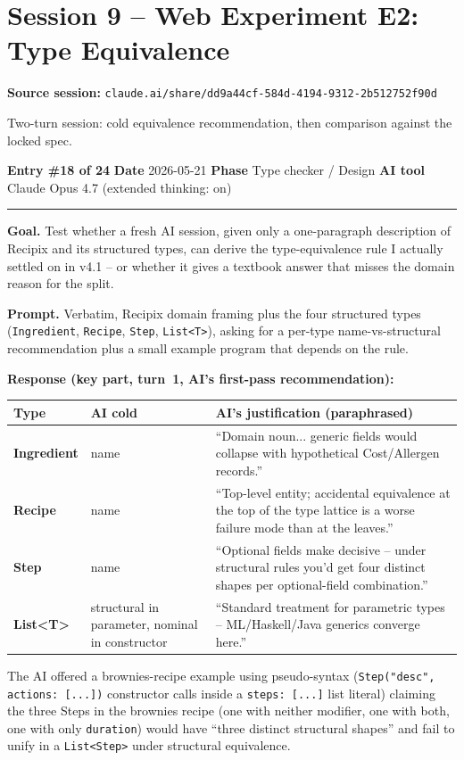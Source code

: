 \documentclass[11pt,a4paper]{article}
\newcommand{\entryheader}[4]{%
    \par\vspace{1em}\noindent\textbf{Entry \#{#1}} \textbullet{} \textbf{Date} #2 \textbullet{} \textbf{Phase} #3 \textbullet{} \textbf{AI tool} #4 \par\vspace{0.3em}\noindent\rule{\textwidth}{0.4pt}\par\vspace{0.3em}}
\newcommand{\sessionheader}[1]{%
    \par\vspace{1.5em}\noindent\textbf{Source session: }\texttt{#1}\par\vspace{0.5em}}
\newcommand{\field}[1]{\noindent\textbf{#1}}
\begin{document}
\section{Session 9 -- Web Experiment E2: Type Equivalence}

\sessionheader{claude.ai/share/dd9a44cf-584d-4194-9312-2b512752f90d}

Two-turn session: cold equivalence recommendation, then comparison
against the locked spec.

\entryheader{18 of 24}{2026-05-21}{Type checker / Design}{Claude Opus 4.7 (extended thinking: on)}

\field{Goal.} Test whether a fresh AI session, given only a
one-paragraph description of Recipix and its structured types, can
derive the type-equivalence rule I actually settled on in v4.1 -- or
whether it gives a textbook answer that misses the domain reason for
the split.

\field{Prompt.} Verbatim, Recipix domain framing plus the four
structured types (\texttt{Ingredient}, \texttt{Recipe}, \texttt{Step},
\texttt{List<T>}), asking for a per-type name-vs-structural
recommendation plus a small example program that depends on the rule.

\field{Response (key part, turn~1, AI's first-pass recommendation):}

\begin{center}
\small
\begin{tabular}{@{}lp{}p{}@{}}
\toprule
\textbf{Type} & \textbf{AI cold} & \textbf{AI's justification (paraphrased)} \\
\midrule
\textbf{Ingredient} & name & ``Domain noun... generic fields would collapse with hypothetical Cost/Allergen records.'' \\
\textbf{Recipe} & name & ``Top-level entity; accidental equivalence at the top of the type lattice is a worse failure mode than at the leaves.'' \\
\textbf{Step} & name & ``Optional fields make decisive -- under structural rules you'd get four distinct shapes per optional-field combination.'' \\
\textbf{List\textless T\textgreater} & structural in parameter, nominal in constructor & ``Standard treatment for parametric types -- ML/Haskell/Java generics converge here.'' \\
\bottomrule
\end{tabular}
\end{center}

The AI offered a brownies-recipe example using pseudo-syntax
(\texttt{Step("desc", actions: [...])} constructor calls inside a
\texttt{steps: [...]} list literal) claiming the three Steps in the
brownies recipe (one with neither modifier, one with both, one with
only \texttt{duration}) would have ``three distinct structural
shapes'' and fail to unify in a \texttt{List<Step>} under structural
equivalence.
\end{document}
